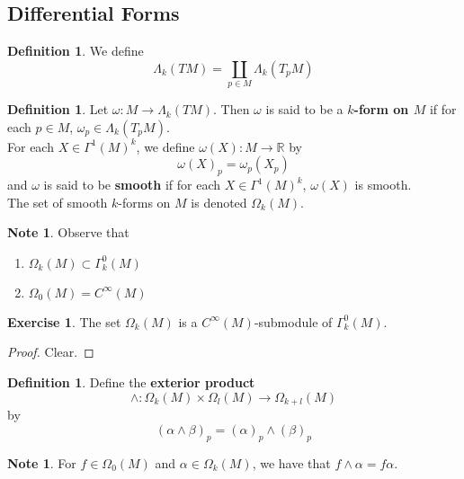 \documentclass[12pt]{amsart}
\theoremstyle{definition}
\newtheorem{defn}[definition]{Definition}
\newtheorem{note}[definition]{Note}
\newtheorem{ex}[definition]{Exercise}
\newcommand{\al}{\alpha}
\newcommand{\Gam}{\Gamma}
\newcommand{\Lam}{\Lambda}
\newcommand{\om}{\omega}
\newcommand{\Om}{\Omega}
\newcommand{\R}{\mathbb{R}}
\begin{document}
	
	
	
	
	
	
	
	
	
	
	

	
	\newpage	
	\subsection{Differential Forms}
	
	\begin{defn}
		We define $$\Lam_k (TM) = \coprod_{p \in M} \Lam_k(T_p M)$$
	\end{defn}
	
	\begin{defn}
		Let $\om: M \rightarrow \Lam_k (TM)$. Then $\om$ is said to be a \textbf{$k$-form on $M$} if for each $p \in M$, $\om_p \in \Lam_k(T_pM)$.\\
		For each $X \in \Gam^1(M)^k$, we define $\om(X) : M \rightarrow \R$ by $$\om(X)_p = \om_p(X_p)$$
		and $\om$ is said to be \textbf{smooth} if for each $X \in \Gam^1(M)^k$, $\om(X)$ is smooth.\\
		The set of smooth $k$-forms on $M$ is denoted $\Om_k(M)$.\\
	\end{defn} 

	\begin{note}
		Observe that 
		\begin{enumerate}
		\item $\Om_k(M) \subset \Gamma^0_k(M)$
		\item $\Om_0(M) = C^{\infty}(M)$
		\end{enumerate}
	\end{note}
	
	\begin{ex}
	The set $\Om_k(M)$ is a $C^{\infty}(M)$-submodule of $\Gam^0_k(M)$.
	\end{ex}
	
	\begin{proof}
	Clear.
	\end{proof}

	

	\begin{defn}
		Define the \textbf{exterior product} $$\wedge: \Om_k(M) \times \Om_l(M) \rightarrow \Om_{k+l}(M) $$ by $$(\al \wedge \beta)_p = (\al)_p \wedge (\beta)_p$$
	\end{defn}
	
	\begin{note}
		For $f \in \Om_0(M)$ and $\al \in \Om_k(M)$, we have that $f \wedge \al = f \al$.
	\end{note}
	
\end{document}
